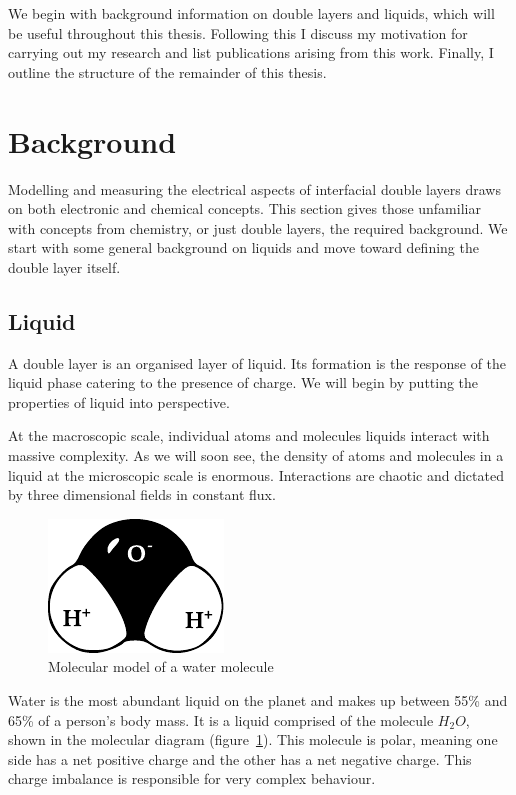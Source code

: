 We begin with background information on double layers and liquids, which will be useful throughout this thesis.
Following this I discuss my motivation for carrying out my research and list publications arising from this work.
Finally, I outline the structure of the remainder of this thesis.

\section{Background}
  Modelling and measuring the electrical aspects of interfacial double layers draws on both electronic and chemical concepts.
  This section gives those unfamiliar with concepts from chemistry, or just double layers, the required background.
  We start with some general background on liquids and move toward defining the double layer itself.

  \subsection{Liquid}
    A double layer is an organised layer of liquid.
    Its formation is the response of the liquid phase catering to the presence of charge.
    We will begin by putting the properties of liquid into perspective.

    At the macroscopic scale, individual atoms and molecules liquids interact with massive complexity.
    As we will soon see, the density of atoms and molecules in a liquid at the microscopic scale is enormous.
    Interactions are chaotic and dictated by three dimensional fields in constant flux.

    \begin{figure}
        \begin{center}
            \includegraphics{content/introduction/graphics/polarWater}
        \end{center}
        \caption{Molecular model of a water molecule}
        \label{fig:waterMolecule}
    \end{figure}

    Water is the most abundant liquid on the planet and makes up between 55\% and 65\% of a person's body mass.
    It is a liquid comprised of the molecule $H_{2}O$, shown in the molecular diagram (figure~\ref{fig:waterMolecule}).
    This molecule is polar, meaning one side has a net positive charge and the other has a net negative charge.
    This charge imbalance is responsible for very complex behaviour.

